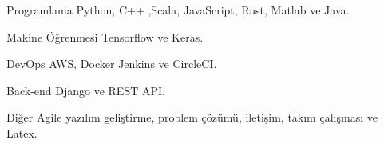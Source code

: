 \documentclass[12pt, a4paper]{awesome-cv_turkish}
\begin{document}
\begin{cvskills}
  \cvskill
    {Programlama} %
    {Python, C++ ,Scala, JavaScript, Rust, Matlab ve Java.} %

  \cvskill
    {Makine Öğrenmesi} %
  { Tensorflow ve Keras.} %

  \cvskill
    {DevOps} %
    {AWS, Docker Jenkins ve CircleCI.} %

  \cvskill
    {Back-end} %
    {Django ve REST API.} %

  \cvskill
    {Diğer} %
    {Agile yazılım geliştirme, problem çözümü, iletişim, takım çalışması ve Latex.} %


\end{cvskills}
\end{document}
